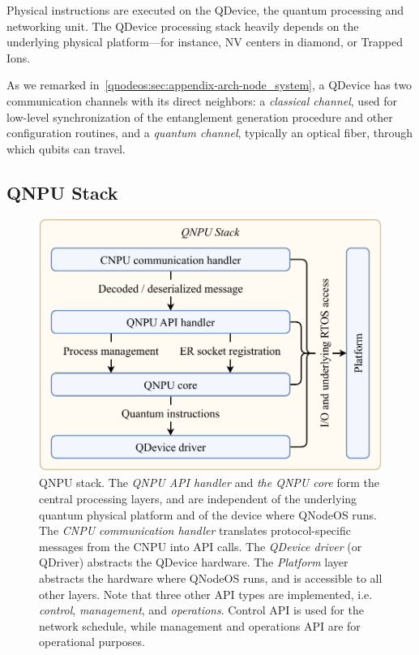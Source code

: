 Physical instructions are executed on the \ac{QDevice}, the quantum processing and networking unit. The \ac{QDevice} processing stack heavily depends on the underlying physical platform---for instance, \ac{NV} centers in diamond, or Trapped Ions.

As we remarked in~\cref{qnodeos:sec:appendix-arch-node_system}, a \ac{QDevice} has two communication channels with its direct neighbors: a \emph{classical channel}, used for low-level synchronization of the entanglement generation procedure and other configuration routines, and a \emph{quantum channel}, typically an optical fiber, through which qubits can travel.

\subsection{QNPU Stack}
\label{qnodeos:sec:design:qnpu_stack}

\begin{figure}
\begin{center}
\includegraphics[width=\linewidth]{figures/qnodeos/supplementary/qnodeos-stack.pdf}
\end{center}
\caption[]{\ac{QNPU} stack. The \emph{\ac{QNPU} \acs{API} handler} and \emph{the \ac{QNPU} core} form the central processing layers, and are independent of the underlying quantum physical platform and of the device where \ac{QNodeOS} runs. The \emph{\ac{CNPU} communication handler} translates protocol-specific messages from the \ac{CNPU} into \acs{API} calls. The \emph{\ac{QDevice} driver} (or \ac{QDriver}) abstracts the \ac{QDevice} hardware. The \emph{Platform} layer abstracts the hardware where \ac{QNodeOS} runs, and is accessible to all other layers. Note that three other \ac{API} types are implemented, i.e. \emph{control}, \emph{management}, and \emph{operations}. Control \ac{API} is used for the network schedule, while management and operations \ac{API} are for operational purposes. }
\label{fig:qnodeos-stack}
\end{figure}

